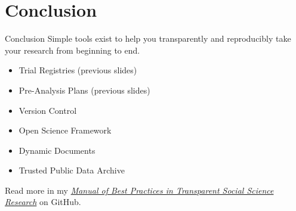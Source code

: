 \documentclass{beamer}
\begin{document}
\section{Conclusion}
\begin{frame}{Conclusion}
Simple tools exist to help you transparently and reproducibly take your research from beginning to end. 
\begin {itemize}
\item Trial Registries (previous slides)
\item Pre-Analysis Plans (previous slides)
\item Version Control
\item Open Science Framework
\item Dynamic Documents
\item Trusted Public Data Archive
\end{itemize} 
\vspace{0.25in}
Read more in my \href{http://github.com/garretchristensen/manual}{\textit{Manual of Best Practices in Transparent Social Science Research}} on GitHub.
\end{frame}
\end{document}

